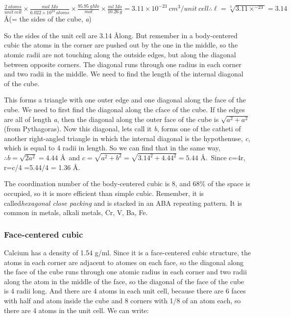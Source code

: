 \documentclass[ignorenonframetext]{beamer}
\begin{document}
\(\frac{2\ atoms}{unit\ cell}\times\frac{mol\ Mo}{6.022\times10^{23}\ atoms}\times\frac{95.95\ g Mo}{mol}\times\frac{ml\ Mo}{10.26\ g} = 3.11\times10^{-23}\ cm^3/unit\ cell \therefore \ell = \sqrt[3]{3.11\times^{-23}} = 3.14\) \AA (= the sides of the cube, \textit{a}) 

So the sides of the unit cell are 3.14 \AA long. But remember in a body-centered cubic the atoms in the corner are pushed out by the one in the middle, so the atomic radii are not touching along the outside edges, but along the diagonal between opposite corners. The diagonal runs through one radius in each corner and two radii in the middle. We need to find the length of the internal diagonal of the cube.

This forms a triangle with one outer edge and one diagonal along the face of the cube. We need to first find the diagonal along the cface of the cube. If the edges are all of length \textit{a}, then the diagonal along the outer face of the cube is \(\sqrt{a^2 + a^2}\) (from Pythagoras). Now this diagonal, lets call it \textit{b}, forms one of the catheti of another right-angled triangle in which the internal diagonal is the hypothenuse, \textit{c}, which is equal to 4 radii in length. So we can find that in the same way, \(\therefore b=\sqrt{2a^2} = 4.44\) \AA\ and \(c = \sqrt{a^2 + b^2} = \sqrt{3.14^2 + 4.44^2} = 5.44\) \AA.\ Since c=4r, r=c/4 =5.44/4 = 1.36 \AA.

The coordination number of the body-centered cubic is 8, and 68\% of the space is occupied, so it is more efficient than simple cubic. Remember, it is called\textit{hexagonal close packing} and is stacked in an ABA repeating pattern. It is common in metals, alkali metals, Cr, V, Ba, Fe.

\subsubsection{Face-centered cubic}

Calcium has a density of 1.54 g/ml. Since it is a face-centered cubic structure, the atoms in each corner are adjacent to atomes on each face, so the diagonal along the face of the cube runs through one atomic radius in each corner and two radii along the atom in the middle of the face, so the diagonal of the face of the cube is 4 radii long. And there are 4 atoms in each unit cell, because there are 6 faces with half and atom inside the cube and 8 corners with 1/8 of an atom each, so there are 4 atoms in the unit cell. We can write:
\end{document}
